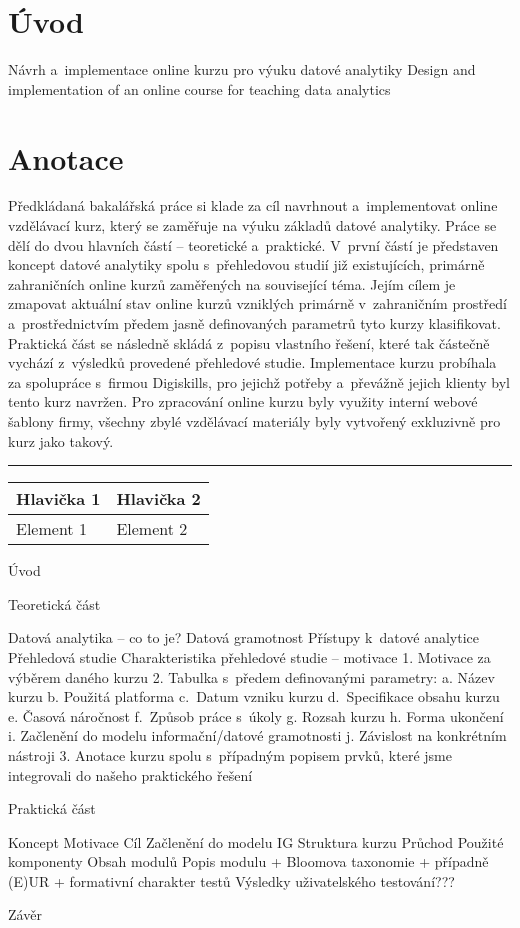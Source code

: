 \hypertarget{uxfavod}{%
\chapter*{Úvod}\label{uvod}}

Návrh a~implementace online kurzu pro výuku datové analytiky Design and
implementation of an online course for teaching data analytics

\chapter*{Anotace}

Předkládaná bakalářská práce si klade za cíl navrhnout a~implementovat
online vzdělávací kurz, který se zaměřuje na výuku základů datové
analytiky. Práce se dělí do dvou hlavních částí -- teoretické
a~praktické. V~první částí je představen koncept datové analytiky spolu
s~přehledovou studií již existujících, primárně zahraničních online kurzů
zaměřených na související téma. Jejím cílem je zmapovat aktuální stav
online kurzů vzniklých primárně v~zahraničním prostředí
a~prostřednictvím předem jasně definovaných parametrů tyto kurzy
klasifikovat. Praktická část se následně skládá z~popisu vlastního
řešení, které tak částečně vychází z~výsledků provedené přehledové
studie. Implementace kurzu probíhala za spolupráce s~firmou Digiskills,
pro jejichž potřeby a~převážně jejich klienty byl tento kurz navržen.
Pro zpracování online kurzu byly využity interní webové šablony firmy,
všechny zbylé vzdělávací materiály byly vytvořený exkluzivně pro kurz
jako takový.

\begin{center}\rule{0.5\linewidth}{0.5pt}\end{center}

\begin{longtable}[]{@{}ll@{}}
\toprule
Hlavička 1 & Hlavička 2 \\
\midrule
\endhead
Element 1 & Element 2 \\
\bottomrule
\end{longtable}

Úvod

Teoretická část

Datová analytika -- co to je? Datová gramotnost Přístupy k~datové
analytice Přehledová studie Charakteristika přehledové studie --
motivace 1. Motivace za výběrem daného kurzu 2. Tabulka s~předem
definovanými parametry: a. Název kurzu b. Použitá platforma c.~Datum
vzniku kurzu d.~Specifikace obsahu kurzu e. Časová náročnost f.~Způsob
práce s~úkoly g. Rozsah kurzu h. Forma ukončení i. Začlenění do modelu
informační/datové gramotnosti j. Závislost na konkrétním nástroji 3.
Anotace kurzu spolu s~případným popisem prvků, které jsme integrovali do
našeho praktického řešení

Praktická část

Koncept Motivace Cíl Začlenění do modelu IG Struktura kurzu Průchod
Použité komponenty Obsah modulů Popis modulu + Bloomova taxonomie +
případně (E)UR + formativní charakter testů Výsledky uživatelského
testování???

Závěr
